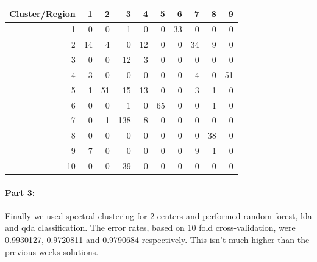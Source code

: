 \documentclass[12pt, leqno]{article}
\begin{document}
\begin{table}[ht]
\centering
\begin{tabular}{rrrrrrrrrr}
  \hline
Cluster/Region  & 1 & 2 & 3 & 4 & 5 & 6 & 7 & 8 & 9 \\ 
  \hline
1 &   0 &   0 &   1 &   0 &   0 &  33 &   0 &   0 &   0 \\ 
  2 &  14 &   4 &   0 &  12 &   0 &   0 &  34 &   9 &   0 \\ 
  3 &   0 &   0 &  12 &   3 &   0 &   0 &   0 &   0 &   0 \\ 
  4 &   3 &   0 &   0 &   0 &   0 &   0 &   4 &   0 &  51 \\ 
  5 &   1 &  51 &  15 &  13 &   0 &   0 &   3 &   1 &   0 \\ 
  6 &   0 &   0 &   1 &   0 &  65 &   0 &   0 &   1 &   0 \\ 
  7 &   0 &   1 & 138 &   8 &   0 &   0 &   0 &   0 &   0 \\ 
  8 &   0 &   0 &   0 &   0 &   0 &   0 &   0 &  38 &   0 \\ 
  9 &   7 &   0 &   0 &   0 &   0 &   0 &   9 &   1 &   0 \\ 
  10 &   0 &   0 &  39 &   0 &   0 &   0 &   0 &   0 &   0 \\ 
   \hline
\end{tabular}
\end{table}


\pagebreak
\paragraph{Part 3:}
Finally we used spectral clustering for 2 centers and performed random
forest, lda and qda classification. The error rates, based on 10 fold cross-validation, were 0.9930127,
0.9720811 and 0.9790684 respectively. This isn't much higher than the
previous weeks solutions. 





 
\end{document}
